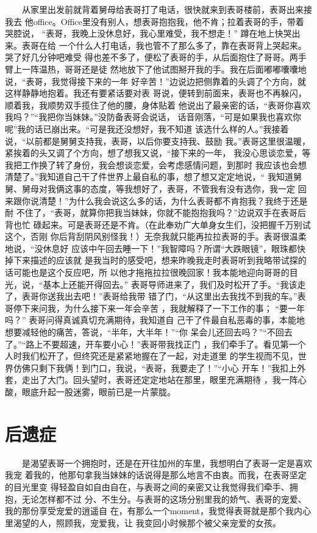 \documentclass[12pt]{book}
\begin{document}
　　从家里出发前就背着舅母给表哥打了电话，很快就来到表哥楼前，表哥出来接我去
他office。Office里没有别人，想表哥抱抱我，他不肯；拉着表哥的手，带着哭腔说，
“表哥，我晚上没休息好，我心里难受，我不想走！” 蹲在地上快哭出来。表哥在给
一个什么人打电话，我也管不了那么多了，靠在表哥背上哭起来。哭了好几分钟吧难受
得也差不多了，便松了表哥的手，从后面抱住了哥哥。两手臂上一阵温热，哥哥还是徒
然地放下了他试图掰开我的手。我在后面嘟嘟囔囔地说，“表哥，我觉得接下来的一年
好辛苦！”边说边把侧靠着的头调了个方向，就这样静静地抱着。我还有要紧话要对表
哥说，便转到前面来，表哥也不再躲闪，顺着我，我顺势双手揽住了他的腰，身体贴着
他说出了最亲密的话，“表哥你喜欢我吗？”“我把你当妹妹。”没防备表哥会说话，
话音刚落，“可是如果我也喜欢你呢”我的话已崩出来。“可是我还没想好，我不知道
该选什么样的人。”我接着说，“以前都是舅舅支持我，表哥，以后你要支持我、鼓励
我。”表哥这里很温暖，紧挨着的头又调了个方向，想了想我又说，“接下来的一年，
我没心思谈恋爱，等我把工作换了转了身份，我会想谈恋爱，会考虑感情问题，到那时
我应该也会想清楚了。”我知道自己干了件世界上最自私的事，想了想又定定地说，“
我知道舅舅、舅母对我俩这事的态度，等我想好了，表哥，不管我有没有选你，我一定
回来跟你说清楚！”为什么我会说这么多的话，为什么表哥都不肯抱我？我终于还是耐
不住了，“表哥，就算你把我当妹妹，你就不能抱抱我吗？”边说双手在表哥后背也忙
碌起来。可是表哥还是不肯。（在此奉劝广大单身女生们，没把握千万别试这个，否刚
你后背刮阴风别怪我！）无奈我就只能再拉拉表哥的手。表哥很温柔地说，“没休息好
应该中午回去睡一下！”我智障吗？所谓“大跌眼镜”，眼珠都快掉下来描述的应该就
是我当时的感受吧，想来昨晚我走时表哥听到我略带试探的话可能也是这个反应吧，所
以他才拖拖拉拉很晚回家！我本能地迎向哥哥的目光，说，“基本上还能开得回去。”
表哥导师进来了，我们及时松开了手。“我该走了，表哥你送我出去吧！”表哥给我带
错了门，“从这里出去我找不到我的车。”表哥停下来问我，为什么接下来一年会辛苦
，我就解释了一下工作的事； “要一年吗？” 表哥问得真诚真切充满期待，我知道自
己干了件最自私恶毒的事，本能地想要减轻他的痛苦，答说，“半年，大半年！”“你
呆会儿还回去吗？”“不回去了。”“路上不要超速，开车要小心！”表哥带我找正门
，我们牵手了。看见第一个人时我们松开了，但终究还是紧紧地握在了一起，对走道里
的学生视而不见，世界仿佛只剩下我俩！到门口，我说，“表哥，我要走了！”“小心
开车！”我扣上外套，走出了大门。回头望时，表哥还定定地站在那里，眼里充满期待
，我一阵心酸，眼底升起一股迷雾，眼前已是一片蒙胧。

\section{后遗症}
\label{sec-7-8}

　　是渴望表哥一个拥抱时，还是在开往加州的车里，我想明白了表哥一定是喜欢我宠
着我的，他那句拿我当妹妹的话说得是那么地言不由衷。而我，在表哥坚定的目光里变
得轻盈自如自由自在，与表哥之间的亲密又让我觉得我们牵手、拥抱，无论怎样都不过
分、不生分。与表哥的这场分别里我的娇气、表哥的宠爱、我的那份享受宠爱的逍遥自
在，有那么一个moment，我觉得表哥就是那个我内心里渴望的人，照顾我，宠爱我，让
我变回小时候那个被父亲宠爱的女孩。
\end{document}

